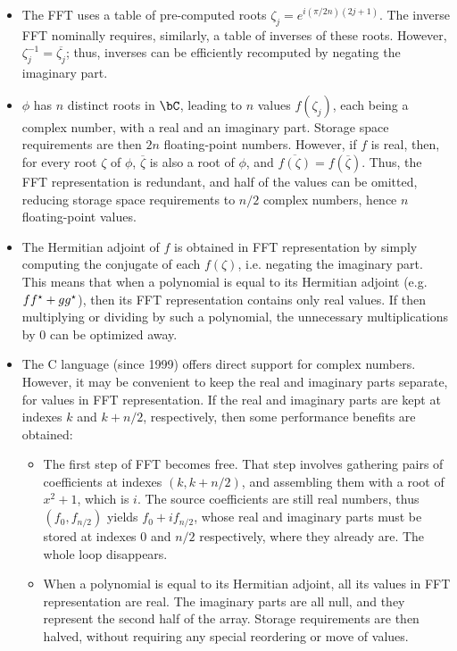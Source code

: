 \begin{itemize}

  \item The FFT uses a table of pre-computed roots $\zeta_j =
  e^{i(\pi/2n)(2j+1)}$. The inverse FFT nominally requires, similarly, a
  table of inverses of these roots. However, $\zeta_j^{-1} =
  \overline{\zeta_j}$; thus, inverses can be efficiently recomputed by
  negating the imaginary part.

  \item $\phi$ has $n$ distinct roots in $\bC$, leading to $n$ values
  $f(\zeta_j)$, each being a complex number, with a real and an
  imaginary part. Storage space requirements are then $2n$
  floating-point numbers. However, if $f$ is real, then, for every root
  $\zeta$ of $\phi$, $\overline\zeta$ is also a root of $\phi$, and
  $\overline{f(\zeta)} = f(\overline\zeta)$. Thus, the FFT
  representation is redundant, and half of the values can be omitted,
  reducing storage space requirements to $n/2$ complex numbers, hence
  $n$ floating-point values.

  \item The Hermitian adjoint of $f$ is obtained in FFT representation
  by simply computing the conjugate of each $f(\zeta)$, i.e. negating
  the imaginary part. This means that when a polynomial is equal to its
  Hermitian adjoint (e.g. $ff^\star+gg^\star$), then its FFT
  representation contains only real values. If then multiplying or
  dividing by such a polynomial, the unnecessary multiplications by $0$
  can be optimized away.

  \item The C language (since 1999) offers direct support for complex
  numbers. However, it may be convenient to keep the real and imaginary
  parts separate, for values in FFT representation. If the real and
  imaginary parts are kept at indexes $k$ and $k+n/2$, respectively,
  then some performance benefits are obtained:
  \begin{itemize}

    \item The first step of FFT becomes free. That step involves
    gathering pairs of coefficients at indexes $(k,k+n/2)$, and
    assembling them with a root of $x^2+1$, which is $i$. The source
    coefficients are still real numbers, thus $(f_0,f_{n/2})$ yields
    $f_0+if_{n/2}$, whose real and imaginary parts must be stored at
    indexes $0$ and $n/2$ respectively, where they already are. The
    whole loop disappears.

    \item When a polynomial is equal to its Hermitian adjoint, all
    its values in FFT representation are real. The imaginary parts
    are all null, and they represent the second half of the array.
    Storage requirements are then halved, without requiring any special
    reordering or move of values.
  \end{itemize}

\end{itemize}


